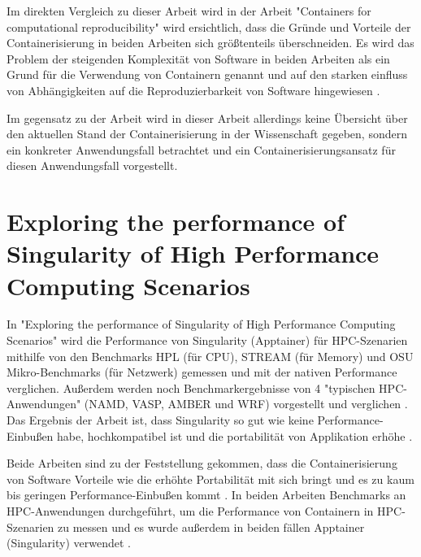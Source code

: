 Im direkten Vergleich zu dieser Arbeit wird in der Arbeit "Containers for computational reproducibility" \cite{moreauContainersComputationalReproducibility2023} wird ersichtlich, dass die Gründe und Vorteile der Containerisierung in beiden Arbeiten sich größtenteils überschneiden. Es wird das Problem der steigenden Komplexität von Software in beiden Arbeiten als ein Grund für die Verwendung von Containern genannt \cite[Vgl. S. 1]{moreauContainersComputationalReproducibility2023} und auf den starken einfluss von Abhängigkeiten auf die Reproduzierbarkeit von Software hingewiesen \cite[Vgl. S. 2]{moreauContainersComputationalReproducibility2023}. 

Im gegensatz zu der Arbeit wird in dieser Arbeit allerdings keine Übersicht über den aktuellen Stand der Containerisierung in der Wissenschaft gegeben, sondern ein konkreter Anwendungsfall betrachtet und ein Containerisierungsansatz für diesen Anwendungsfall vorgestellt.



\section{Exploring the performance of Singularity of High Performance Computing Scenarios \cite{huExploringPerformanceSingularity2019}}

In "Exploring the performance of Singularity of High Performance Computing Scenarios" wird die Performance von Singularity (Apptainer) für HPC-Szenarien mithilfe von den Benchmarks HPL (für CPU), STREAM (für Memory) und OSU Mikro-Benchmarks (für Netzwerk) gemessen und mit der nativen Performance verglichen. Außerdem werden noch Benchmarkergebnisse von 4 "typischen HPC-Anwendungen" (NAMD, VASP, AMBER und WRF) vorgestellt und verglichen \cite[Vgl. S. 2587]{huExploringPerformanceSingularity2019}. Das Ergebnis der Arbeit ist, dass Singularity so gut wie keine Performance-Einbußen habe, hochkompatibel ist und die portabilität von Applikation erhöhe \cite[Vgl. S. 2592]{huExploringPerformanceSingularity2019}.  

Beide Arbeiten sind zu der Feststellung gekommen, dass die Containerisierung von Software Vorteile wie die erhöhte Portabilität mit sich bringt und es zu kaum bis geringen Performance-Einbußen kommt \cite[Vgl. S. 2592]{huExploringPerformanceSingularity2019}. In beiden Arbeiten Benchmarks an HPC-Anwendungen durchgeführt, um die Performance von Containern in HPC-Szenarien zu messen \cite[Vgl. S. 2587]{huExploringPerformanceSingularity2019} und es wurde außerdem in beiden fällen Apptainer (Singularity) verwendet \cite[Vgl. S. 2587]{huExploringPerformanceSingularity2019}.

